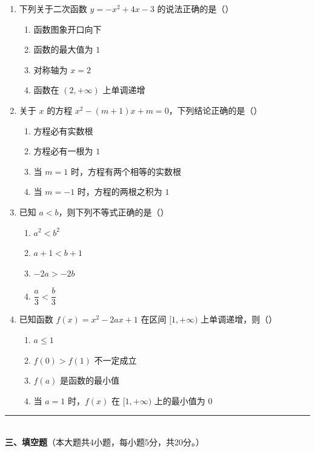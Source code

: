 \documentclass[12pt, a4paper]{ctexart}
\begin{document}
\begin{enumerate}[resume]
\item 下列关于二次函数 $y=-x^2+4x-3$ 的说法正确的是（\quad）
  \begin{enumerate}[label=\Alph*., itemsep=0pt]
    \item 函数图象开口向下
    \item 函数的最大值为 $1$
    \item 对称轴为 $x=2$
    \item 函数在 $(2,+\infty)$ 上单调递增
  \end{enumerate}

\item 关于 $x$ 的方程 $x^2-(m+1)x+m=0$，下列结论正确的是（\quad）
  \begin{enumerate}[label=\Alph*., itemsep=0pt]
    \item 方程必有实数根
    \item 方程必有一根为 $1$
    \item 当 $m=1$ 时，方程有两个相等的实数根
    \item 当 $m=-1$ 时，方程的两根之积为 $1$
  \end{enumerate}

\item 已知 $a<b$，则下列不等式正确的是（\quad）
  \begin{enumerate}[label=\Alph*., itemsep=0pt]
    \item $a^2<b^2$
    \item $a+1<b+1$
    \item $-2a>-2b$
    \item $\dfrac{a}{3}<\dfrac{b}{3}$
  \end{enumerate}

\item 已知函数 $f(x)=x^2-2ax+1$ 在区间 $[1,+\infty)$ 上单调递增，则（\quad）
  \begin{enumerate}[label=\Alph*., itemsep=0pt]
    \item $a\leq 1$
    \item $f(0)>f(1)$ 不一定成立
    \item $f(a)$ 是函数的最小值
    \item 当 $a=1$ 时，$f(x)$ 在 $[1,+\infty)$ 上的最小值为 $0$
  \end{enumerate}
\end{enumerate}

\vspace{6pt}

\noindent\rule{\textwidth}{0.4pt}\\[2pt]
{\large\bfseries 三、填空题}（本大题共4小题，每小题5分，共20分。）
\end{document}

